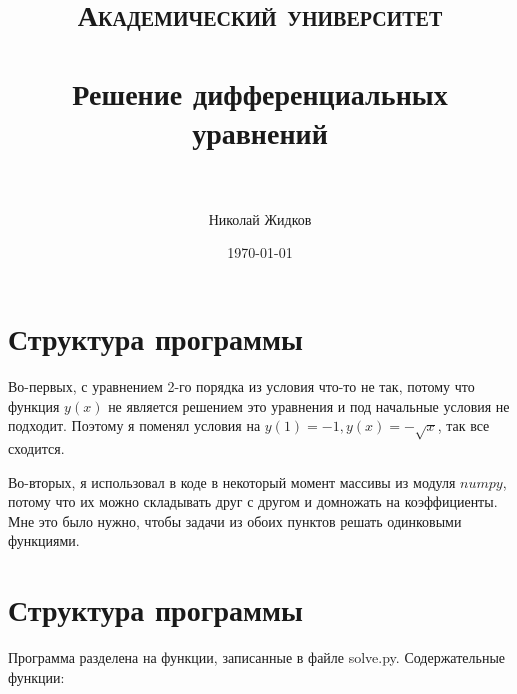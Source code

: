 \documentclass[paper=a4, fontsize=11pt]{scrartcl} %
\title{	
\normalfont \normalsize 
\textsc{Академический университет} \\ [25pt] %
\horrule{0.5pt} \\[0.4cm] %
\huge Решение дифференциальных уравнений  \\ %
\horrule{2pt} \\[0.5cm] %
}
\author{Николай Жидков} %
\date{\normalsize\today} %
\numberwithin{equation}{section} %
\numberwithin{figure}{section} %
\numberwithin{table}{section} %
\begin{document}
\maketitle %


\section{Структура программы}

Во-первых, с уравнением 2-го порядка из условия что-то не так, потому что функция $y(x)$ не является решением это уравнения и под начальные условия не подходит. Поэтому я поменял условия на $y(1)=-1, y(x)=-\sqrt{x}$, так все сходится.

Во-вторых, я использовал в коде в некоторый момент массивы из модуля $numpy$, потому что их можно складывать друг с другом и домножать на коэффициенты. Мне это было нужно, чтобы задачи из обоих пунктов решать одинковыми функциями.


\section{Структура программы}

Программа разделена на функции, записанные в файле solve.py. Содержательные функции: 
\end{document}
